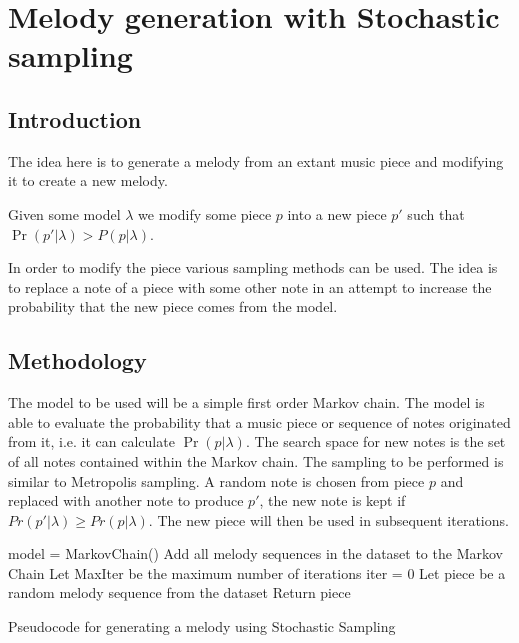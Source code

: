 \chapter{Melody generation with Stochastic sampling}
\section{Introduction}
The idea here is to generate a melody from an extant music piece and modifying it to create a new melody. 

Given some model $\lambda$ we modify some piece $p$ into a new piece $p'$ such that $\Pr(p'|\lambda) > P(p|\lambda)$.


In order to modify the piece various sampling methods can be used. The idea is to replace a note of a piece with some other note in an attempt to increase the probability that the new piece comes from the model. 

\section{Methodology}
The model to be used will be a simple first order Markov chain. The model is able to evaluate the probability that a music piece or sequence of notes originated from it, i.e. it can calculate $\Pr(p|\lambda)$. The search space for new notes is the set of all notes contained within the Markov chain.
The sampling to be performed is similar to Metropolis sampling. A random note is chosen from piece $p$ and replaced with another note to produce $p'$, the new note is kept if $Pr(p'|\lambda) \geq Pr(p|\lambda)$. The new piece will then be used in subsequent iterations.

\begin{algorithm}
 model = MarkovChain()\;
 Add all melody sequences in the dataset to the Markov Chain\;
 Let MaxIter be the maximum number of iterations\;
 iter = 0\;
 Let piece be a random melody sequence from the dataset\;
 Return piece\;
 \caption{Pseudocode for generating a melody using Stochastic Sampling}
\end{algorithm}


